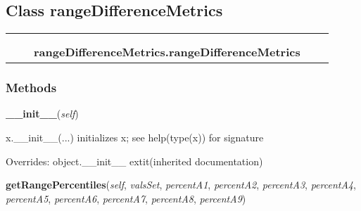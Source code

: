 \subsection{Class rangeDifferenceMetrics}

    \label{rangeDifferenceMetrics:rangeDifferenceMetrics}
\begin{tabular}{cccccc}
\multicolumn{2}{r}{\settowidth{\BCL}{object}\multirow{2}{\BCL}{object}}
&&
  \\\cline{3-3}
  &&\multicolumn{1}{c|}{}
&&
  \\
&&\multicolumn{2}{l}{\textbf{rangeDifferenceMetrics.rangeDifferenceMetrics}}
\end{tabular}



  \subsubsection{Methods}

    \vspace{0.5ex}

\hspace{.8\funcindent}\begin{boxedminipage}{\funcwidth}

    \raggedright \textbf{\_\_init\_\_}(\textit{self})

\setlength{\parskip}{2ex}
    x.\_\_init\_\_(...) initializes x; see help(type(x)) for signature

\setlength{\parskip}{1ex}
      Overrides: object.\_\_init\_\_ 	extit{(inherited documentation)}

    \end{boxedminipage}

    \label{rangeDifferenceMetrics:rangeDifferenceMetrics:getRangePercentiles}

    \vspace{0.5ex}

\hspace{.8\funcindent}\begin{boxedminipage}{\funcwidth}

    \raggedright \textbf{getRangePercentiles}(\textit{self}, \textit{valsSet}, \textit{percentA1}, \textit{percentA2}, \textit{percentA3}, \textit{percentA4}, \textit{percentA5}, \textit{percentA6}, \textit{percentA7}, \textit{percentA8}, \textit{percentA9})

\setlength{\parskip}{2ex}
\setlength{\parskip}{1ex}
    \end{boxedminipage}

